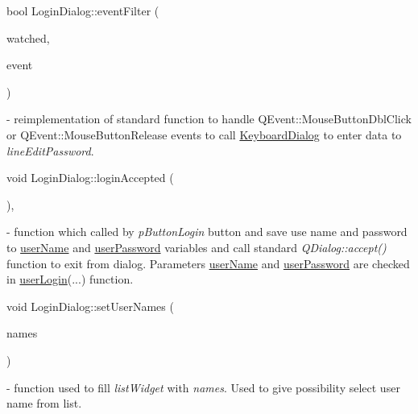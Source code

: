 \mbox{\label{classLoginDialog_a3c1b6041fc659f3f409e129a5c4a7944}} 
{\footnotesize\ttfamily bool Login\+Dialog\+::\texorpdfstring{event\+Filter}{eventFilter} (\begin{DoxyParamCaption}\item[{Q\+Object $\ast$}]{watched,  }\item[{Q\+Event $\ast$}]{event }\end{DoxyParamCaption})\hspace{0.3cm}{\ttfamily [protected]}} - reimplementation of standard function to handle Q\+Event::Mouse\+Button\+Dbl\+Click or Q\+Event::Mouse\+Button\+Release events to call \hyperlink{classKeyboardDialog}{Keyboard\+Dialog} to enter data to
\textit{line\+Edit\+Password}. 

\mbox{\label{classLoginDialog_a7e94645a64f9dd86f7e2bcd6f3dbf7fa}} 
{\footnotesize\ttfamily void Login\+Dialog\+::\texorpdfstring{login\+Accepted}{loginAccepted} (\begin{DoxyParamCaption}{ }\end{DoxyParamCaption})\hspace{0.3cm}{\ttfamily [private]}, {\ttfamily [slot]}} - function which called by \textit{p\+Button\+Login} button and save use name and password to \hyperlink{classLoginDialog_ac3aff74cd5cb23bb5e269775fd7b7672}{user\+Name} and \hyperlink{classLoginDialog_aabe40abeacdb2903b5fa9a61a8562201}{user\+Password} variables and call standard \textit{QDialog::accept()} function to exit from dialog. Parameters \hyperlink{classLoginDialog_ac3aff74cd5cb23bb5e269775fd7b7672}{user\+Name} and \hyperlink{classLoginDialog_aabe40abeacdb2903b5fa9a61a8562201}{user\+Password} are checked in \hyperlink{classMainWindow_a339962b149079e9cdb8928c5528113ea}{user\+Login}(...) function.

\mbox{\label{classLoginDialog_a821b2e18f35f4e4d250213a04c4077de}} 
{\footnotesize\ttfamily void Login\+Dialog\+::\texorpdfstring{set\+User\+Names}{setUserNames} (\begin{DoxyParamCaption}\item[{Q\+String\+List}]{names }\end{DoxyParamCaption})} - function used to fill \textit{listWidget} with \textit{names}. Used to give possibility select user name from list.



